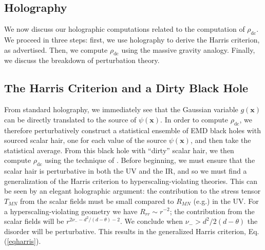 \documentclass[10pt, oneside]{book}
\begin{document}
\begin{doublespace}
\section{Holography}
We now discuss our holographic computations related to the computation of $\rho_{\mathrm{dc}}$.  We proceed in three steps:  first, we use holography to derive the Harris criterion, as advertised.    Then, we compute $\rho_{\mathrm{dc}}$ using the massive gravity analogy.  Finally, we discuss the breakdown of perturbation theory.


\subsection{The Harris Criterion and a Dirty Black Hole}

From standard holography, we immediately see that the Gaussian variable $ g(\mathbf{x})$ can be directly translated to the source of $\psi(\mathbf{x})$. 
  In order to compute $\rho_{\mathrm{dc}}$, we therefore perturbatively construct a statistical ensemble of EMD black holes with sourced scalar hair, one for each value of the source $\psi(\mathbf{x})$, and then take the statistical average.  From this black hole with ``dirty'' scalar hair, we then compute $\rho_{\mathrm{dc}}$ using the technique of \cite{Blake:2013bqa, Blake:2013owa}.   Before beginning, we must ensure that the scalar hair is perturbative in both the UV and the IR, and so we must find a generalization of the Harris criterion to hyperscaling-violating theories.   This can be seen by an elegant holographic argument:   the contribution to the stress tensor $T_{MN}$ from the scalar fields must be small compared to $R_{MN}$ (e.g.) in the UV.   For a hyperscaling-violating geometry we have $R_{rr}\sim r^{-2}$; the contribution from the scalar fields will be $r^{2\nu_-- d^2/(d-\theta) - 2}$.  We conclude when $\nu_- > d^2/2(d-\theta)$ the disorder will be perturbative.   This results in the generalized Harris criterion, Eq. (\ref{eqharris}).


\end{doublespace}
\end{document}
